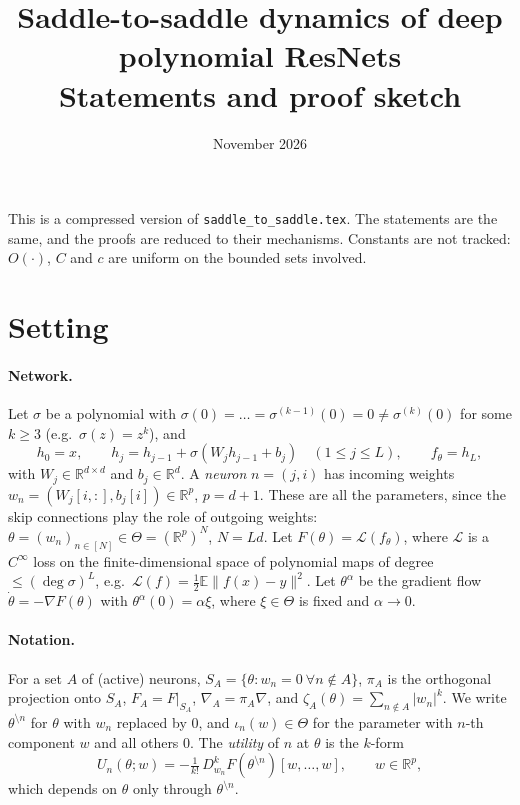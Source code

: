 \documentclass[11pt]{article}
\title{Saddle-to-saddle dynamics of deep polynomial ResNets\\[4pt]\large Statements and proof sketch}
\author{}
\date{November 2026}
\theoremstyle{definition}
\theoremstyle{remark}
\newcommand{\R}{\mathbb{R}}
\newcommand{\E}{\mathbb{E}}
\newcommand{\cL}{\mathcal{L}}
\newcommand{\sm}{\setminus}
\begin{document}
\maketitle

\noindent
This is a compressed version of \texttt{saddle\_to\_saddle.tex}. The statements are the same, and the proofs are reduced to their mechanisms. Constants are not tracked: $O(\cdot)$, $C$ and $c$ are uniform on the bounded sets involved.

\section{Setting}

\paragraph{Network.} Let $\sigma$ be a polynomial with $\sigma(0)=\dots=\sigma^{(k-1)}(0)=0\ne\sigma^{(k)}(0)$ for some $k\ge3$ (e.g.\ $\sigma(z)=z^k$), and
\[
h_0=x,\qquad h_j=h_{j-1}+\sigma(W_jh_{j-1}+b_j)\quad(1\le j\le L),\qquad f_\theta=h_L,
\]
with $W_j\in\R^{d\times d}$ and $b_j\in\R^d$. A \emph{neuron} $n=(j,i)$ has incoming weights $w_n=(W_j[i,:],b_j[i])\in\R^p$, $p=d+1$. These are all the parameters, since the skip connections play the role of outgoing weights: $\theta=(w_n)_{n\in[N]}\in\Theta=(\R^p)^N$, $N=Ld$. Let $F(\theta)=\cL(f_\theta)$, where $\cL$ is a $C^\infty$ loss on the finite-dimensional space of polynomial maps of degree $\le(\deg\sigma)^L$, e.g.\ $\cL(f)=\frac12\E\|f(x)-y\|^2$. Let $\theta^\alpha$ be the gradient flow $\dot\theta=-\nabla F(\theta)$ with $\theta^\alpha(0)=\alpha\xi$, where $\xi\in\Theta$ is fixed and $\alpha\to0$.

\paragraph{Notation.} For a set $A$ of (active) neurons, $S_A=\{\theta:w_n=0\ \forall n\notin A\}$, $\pi_A$ is the orthogonal projection onto $S_A$, $F_A=F|_{S_A}$, $\nabla_A=\pi_A\nabla$, and $\zeta_A(\theta)=\sum_{n\notin A}|w_n|^k$. We write $\theta^{\sm n}$ for $\theta$ with $w_n$ replaced by $0$, and $\iota_n(w)\in\Theta$ for the parameter with $n$-th component $w$ and all others $0$. The \emph{utility} of $n$ at $\theta$ is the $k$-form
\[
U_n(\theta;w)=-\tfrac1{k!}\,D^k_{w_n}F(\theta^{\sm n})[w,\dots,w],\qquad w\in\R^p,
\]
which depends on $\theta$ only through $\theta^{\sm n}$.
\end{document}
